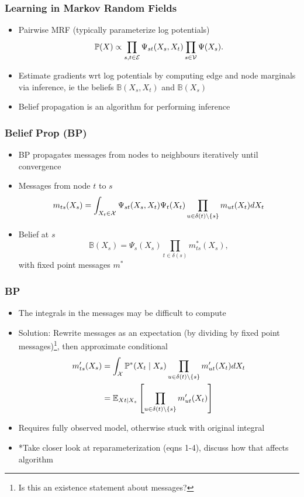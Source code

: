 \documentclass{beamer}
\begin{document}
\begin{frame}
\frametitle{Learning in Markov Random Fields}
\begin{itemize}
\item Pairwise MRF (typically parameterize log potentials)
$$\mathbb{P}(X) \propto \prod_{s,t \in \mathcal{E}} \Psi_{st}(X_s, X_t) \prod_{s\in\mathcal{V}} \Psi(X_s).$$
\item Estimate gradients wrt log potentials by computing edge and node marginals
via inference, ie the beliefs $\mathbb{B}(X_s, X_t)$ and $\mathbb{B}(X_s)$
\vspace{2em}
\item Belief propagation is an algorithm for performing inference
\end{itemize}
\end{frame}

\begin{frame}
\frametitle{Belief Prop (BP)}
\begin{itemize}
\item BP propagates messages from nodes to neighbours iteratively until convergence
\vspace{1em}
\item Messages from node $t$ to $s$
$$m_{ts}(X_s) = \int_{X_t\in\mathcal{X}} \Psi_{st}(X_s, X_t) \Psi_t(X_t)
    \prod_{u\in\delta(t)\setminus\left\{s\right\}} m_{ut}(X_t)dX_t$$
\item Belief at $s$
$$\mathbb{B}(X_s) = \Psi_s(X_s)\prod_{t\in\delta(s)} m_{ts}^*(X_s),$$
with fixed point messages $m^*$
\end{itemize}
\end{frame}

\begin{frame}
\frametitle{BP}
\begin{itemize}
\item The integrals in the messages may be difficult to compute
\vspace{1em}
\item Solution: Rewrite messages as an expectation (by dividing by fixed point messages)\footnote{
Is this an existence statement about messages?
},
then approximate conditional
\begin{align*}
m_{ts}'(X_s) &= \int_{\mathcal{X}} \mathbb{P}^*(X_t \mid X_s)
\prod_{u \in \delta(t)\setminus\left\{s\right\}} m_{ut}'(X_t)dX_t\\
&= \mathbb{E}_{Xt \mid X_s}\left[
\prod_{u \in \delta(t)\setminus\left\{s\right\}} m_{ut}'(X_t)\right]
\end{align*}
\item Requires fully observed model, otherwise stuck with original integral
\vspace{1em}
\item *Take closer look at reparameterization (eqns 1-4),
    discuss how that affects algorithm
\end{itemize}
\end{frame}
\end{document}
